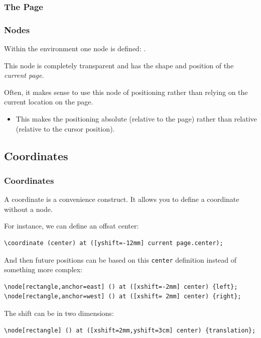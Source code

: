 \subsubsection{The Page}
\begin{frame}[fragile]
  \frametitle{Nodes }
  \vspace{3mm}
  Within the  environment one node is defined: .
  
  \vspace{5mm}
  This node is completely transparent and has the shape and position of the \textsl{current page}.
  
  \pause
  \vspace{5mm}
  Often, it makes sense to use this node of positioning rather than relying on the current location on the page.
  \begin{itemize}
    \item This makes the positioning absolute (relative to the page) rather than relative (relative to the cursor position).
  \end{itemize}
\end{frame}

\subsection{Coordinates}
\begin{frame}[fragile]
  \frametitle{Coordinates}
  \vspace{3mm}
  A coordinate is a convenience construct. It allows you to define a coordinate without a node.
  
  \pause
  \vspace{5mm}
  For instance, we can define an offsat center:
  \begin{verbatim}
\coordinate (center) at ([yshift=-12mm] current page.center);
  \end{verbatim}
  
  \pause
  \vspace{5mm}
  And then future positions can be based on this \texttt{center} definition instead of something more complex:
  \begin{verbatim}
\node[rectangle,anchor=east] () at ([xshift=-2mm] center) {left};
\node[rectangle,anchor=west] () at ([xshift= 2mm] center) {right};
  \end{verbatim}
  
  \pause
  \vspace{5mm}
  The shift can be in two dimensions:
  \begin{verbatim}
\node[rectangle] () at ([xshift=2mm,yshift=3cm] center) {translation};
  \end{verbatim}
\end{frame}

